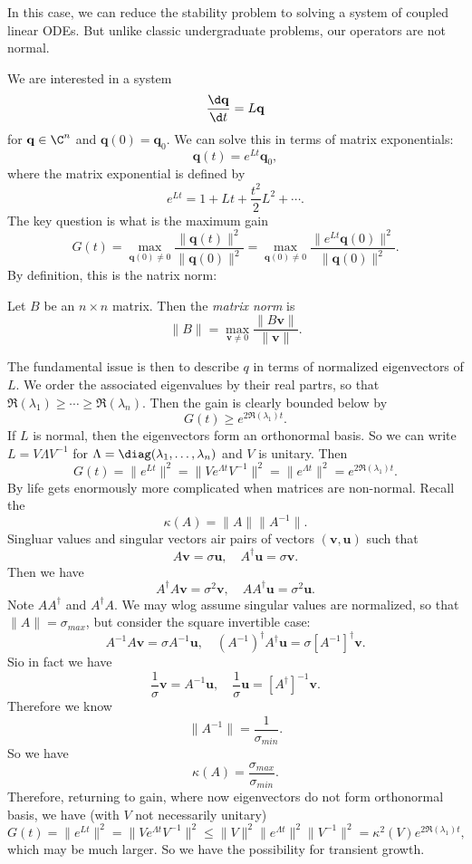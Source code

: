 \documentclass[a4paper]{article}
\begin{document}
In this case, we can reduce the stability problem to solving a system of coupled linear ODEs. But unlike classic undergraduate problems, our operators are not normal.

We are interested in a system
\[
  \frac{\d \mathbf{q}}{\d t} = L \mathbf{q}
\]
for $\mathbf{q} \in \C^n$ and $\mathbf{q}(0) = \mathbf{q}_0$. We can solve this in terms of matrix exponentials:
\[
  \mathbf{q}(t) = e^{Lt} \mathbf{q}_0,
\]
where the matrix exponential is defined by
\[
  e^{Lt} = 1 + Lt + \frac{t^2}{2} L^2 + \cdots.
\]
The key question is what is the maximum gain
\[
  G(t) = \max_{\mathbf{q}(0) \not= 0}\frac{\|\mathbf{q}(t)\|^2}{ \|\mathbf{q}(0)\|^2} = \max_{\mathbf{q}(0) \not= 0} \frac{\|e^{Lt} \mathbf{q}(0)\|^2}{\|\mathbf{q}(0)\|^2}.
\]
By definition, this is the natrix norm:
\begin{defi}
  Let $B$ be an $n \times n$ matrix. Then the \emph{matrix norm} is
  \[
    \|B\| = \max_{\mathbf{v} \not= 0} \frac{\|B\mathbf{v}\|}{\|\mathbf{v}\|}.
  \]
\end{defi}
The fundamental issue is then to describe $q$ in terms of normalized eigenvectors of $L$. We order the associated eigenvalues by their real partrs, so that $\Re(\lambda_1) \geq \cdots \geq \Re(\lambda_n)$. Then the gain is clearly bounded below by
\[
  G(t) \geq e^{2 \Re(\lambda_1)t}.
\]
If $L$ is normal, then the eigenvectors form an orthonormal basis. So we can write $L = V \Lambda V^{-1}$ for $\Lambda = \diag(\lambda_1,\ldots, \lambda_n)$ and $V$ is unitary. Then %
\[
  G(t) = \|e^{Lt}\|^2 = \|V e^{\Lambda t} V^{-1}\|^2 = \|e^{\Lambda t}\|^2 = e^{2 \Re (\lambda_1) t}.
\]
By life gets enormously more complicated when matrices are non-normal. Recall the 
\[
  \kappa(A) = \|A\| \|A^{-1}\|.
\]
Singluar values and singular vectors air pairs of vectors $(\mathbf{v}, \mathbf{u})$ such that
\[
  A\mathbf{v} = \sigma \mathbf{u},\quad A^\dagger \mathbf{u} = \sigma \mathbf{v}.
\]
Then we have
\[
  A^\dagger A \mathbf{v} = \sigma^2 \mathbf{v},\quad AA^\dagger \mathbf{u} = \sigma^2 \mathbf{u}.
\]
Note $AA^\dagger$ and $A^\dagger A$. We may wlog assume singular values are normalized, so that $\|A\|= \sigma_{max}$, but consider the square invertible case:
\[
  A^{-1}A \mathbf{v} = \sigma A^{-1} \mathbf{u},\quad (A^{-1})^\dagger A^\dagger \mathbf{u} = \sigma [A^{-1}]^{\dagger} \mathbf{v}.
\]
Sio in fact we have
\[
  \frac{1}{\sigma} \mathbf{v} = A^{-1} \mathbf{u},\quad \frac{1}{\sigma} \mathbf{u} = [A^\dagger]^{-1} \mathbf{v}.
\]
Therefore we know
\[
  \|A^{-1}\| = \frac{1}{\sigma_{min}}.
\]
So we have
\[
  \kappa(A) = \frac{\sigma_{max}}{\sigma_{min}}.
\]
Therefore, returning to gain, where now eigenvectors do not form orthonormal basis, we have (with $V$ not necessarily unitary)
\[
  G(t) = \|e^{Lt}\|^2 = \|V e^{\Lambda t} V^{-1}\|^2 \leq \|V\|^2 \|e^{\Lambda t}\|^2 \|V^{-1}\|^2 = \kappa^2(V) e^{2 \Re(\lambda_1) t},
\]
which may be much larger. So we have the possibility for transient growth.
\end{document}
